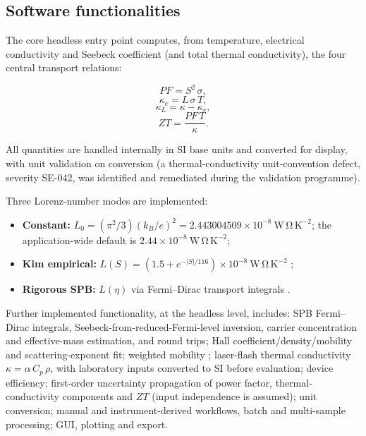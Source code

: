 \documentclass[preprint,12pt, a4paper]{elsarticle}
\begin{document}
\subsection{Software functionalities}
\label{sec:functionalities}

The core headless entry point computes, from temperature, electrical
conductivity and Seebeck coefficient (and total thermal conductivity), the
four central transport relations:

\begin{equation}
PF = S^{2}\,\sigma ,
\end{equation}
\begin{equation}
\kappa_{e} = L\,\sigma\,T ,
\end{equation}
\begin{equation}
\kappa_{L} = \kappa - \kappa_{e} ,
\end{equation}
\begin{equation}
ZT = \frac{PF\,T}{\kappa} .
\end{equation}

All quantities are handled internally in SI base units and converted for
display, with unit validation on conversion (a thermal-conductivity
unit-convention defect, severity SE-042, was identified and remediated during
the validation programme).

Three Lorenz-number modes are implemented:

\begin{itemize}
  \item \textbf{Constant:} $L_{0} = (\pi^{2}/3)(k_{B}/e)^{2} =
        2.443004509\times10^{-8}\ \mathrm{W\,\Omega\,K^{-2}}$; the
        application-wide default is $2.44\times10^{-8}\
        \mathrm{W\,\Omega\,K^{-2}}$;
  \item \textbf{Kim empirical:} $L(S) = (1.5 +
        e^{-|S|/116})\times10^{-8}\ \mathrm{W\,\Omega\,K^{-2}}$
        \cite{kim2015};
  \item \textbf{Rigorous SPB:} $L(\eta)$ via Fermi--Dirac transport
        integrals \cite{maysnyder2012}.
\end{itemize}

Further implemented functionality, at the headless level, includes:
SPB Fermi--Dirac integrals, Seebeck-from-reduced-Fermi-level inversion,
carrier concentration and effective-mass estimation, and round trips; Hall
coefficient/density/mobility and scattering-exponent fit; weighted mobility
\cite{snyder2020}; laser-flash thermal conductivity
$\kappa = \alpha\,C_{p}\,\rho$, with laboratory inputs converted to SI before
evaluation; device efficiency; first-order uncertainty propagation of power
factor, thermal-conductivity components and $ZT$ (input independence is
assumed); unit conversion; manual and instrument-derived workflows, batch and
multi-sample processing; GUI, plotting and export.
\end{document}
